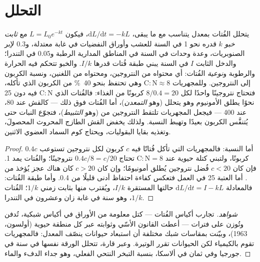 \section{التحلل}

\begin{theorem}\label{thm:b2:living-soil:decay}
يتحلل الفُتات بمعدل يتناسب مع ما يبقى،
$\mathrm{d}L/\mathrm{d}t = -kL$، فيكون $L = L_0 e^{-kt}$ مع
\emph{ثابت خبو} $k$ قدره نحو 1 في السنة للعشب
وأوراق النفضيات في غابة معتدلة، و$0.3$ لإبر الصنوبريات،
وعدة وحدات في السنة في المناطق المدارية الرطبة و$0.05$ في التندرا؛
والدخل الثابت $I$ في السنة يبني طبقة فُتات قدرها $I/k$. والخبو
تتحكم فيه الحرارة والرطوبة و\emph{نوعية} الفُتات:
أي محتواه من النتروجين، ومحتواه من اللغنين، ونسبة
الكربون إلى النتروجين. وللمجهريات $\mathrm{C:N} \approx 8$ وهي
تحتفظ بنحو \qty{40}{\%} من الكربون الذي تأكله، فتحتاج نتروجينًا
واحدًا لكل $8/0.4 = 20$ كربونًا من الغذاء: فالفُتات الذي $\mathrm{C:N}$ فيه
دون 25 نحوًا يطلق الأمونيوم وهو يتحلل
(وهو \emph{التمعدن})، أما الفُتات فوق ذلك --- كالقش عند 80،
 عند 400 --- فيجعل المجهريات تلتقط النتروجين من 
(وهو \emph{التثبيط})، فتجوّع النبات حتى يُتنفَّس الكربون
بعيدًا وتهبط النسبة. ولذلك يخفض القش الطازج
المحروث المحصولَ، وتغذيه بقايا البقوليات،
ويحتاج كوم السماد العضوي الاثنين.
\end{theorem}
\begin{proof}
أما النسبة: فالمجهريات التي تأكل فُتاتًا فيه $c$ كربون لكل
نتروجين تستوعب $0.4c$ كربونًا، ولتبني كتلة حيوية عند
$\mathrm{C:N} = 8$ تحتاج $0.4c/8 = c/20$ نتروجينًا؛ والفُتات
يمد 1. فإن كان $c < 20$ فُضل نتروجين يُطلق
أمونيومًا؛ وإن كان $c > 20$ كان هناك عجز يُؤخذ من . أما
العتبة 25 في العمل فتعكس كفاءة احتفاظ أدنى قليلًا
من 0.4. وأما طبقة الفُتات: فالمعادلة $\mathrm{d}L/\mathrm{d}t = I - kL$
حالتها المستقرة $I/k$، ويُقترب منها بثابت زمني $1/k$؛  الفُتات $1/k$، وهو سنة في غابة زان
وعشرون في التندرا.
\end{proof}
\begin{proof}[شواهد]
تجارب أكياس الفُتات --- كتل معلومة من الأوراق في أكياس شبكية،
تُدفن وتُوزن على فترات --- أعطت القانون الأسّي
وثوابته عبر كل منطقة حيوية (أولسون، 1963)، وبيّنت بمقاسات شبك
مختلفة أن استبعاد حيوانات  ينصّف
المعدل: فالمجهريات تقوم بالكيمياء لكن الحيوانات تقرر الوتيرة.
وعبر قارة، تتحلل الورقة نفسها في سنة في جورجيا
وفي ثمان في ألاسكا، بنسبة التبخر النتحي الفعلي،
وهو جداء الدفء والماء.
\end{proof}

